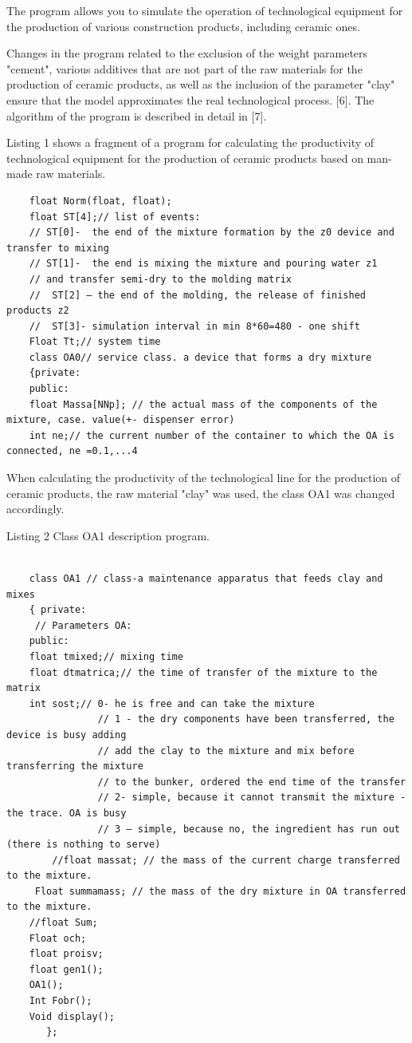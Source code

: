 \begin{multicols}{2}

The program allows you to simulate the operation of technological
equipment for the production of various construction products, including
ceramic ones.

Changes in the program related to the exclusion of the weight parameters
"cement", various additives that are not part of the raw materials for
the production of ceramic products, as well as the inclusion of the
parameter "clay" ensure that the model approximates the real
technological process. {[}6{]}. The algorithm of the program is
described in detail in {[}7{]}.

Listing 1 shows a fragment of a program for calculating the productivity
of technological equipment for the production of ceramic products based
on man-made raw materials.
\end{multicols}

\begin{lstlisting}
	float Norm(float, float);
	float ST[4];// list of events:
	// ST[0]-  the end of the mixture formation by the z0 device and transfer to mixing
	// ST[1]-  the end is mixing the mixture and pouring water z1
	// and transfer semi-dry to the molding matrix
	//  ST[2] – the end of the molding, the release of finished products z2
	//  ST[3]- simulation interval in min 8*60=480 - one shift
	Float Tt;// system time
	class OA0// service class. a device that forms a dry mixture
	{private:
	public:
	float Massa[NNp]; // the actual mass of the components of the mixture, case. value(+- dispenser error)
	int ne;// the current number of the container to which the OA is connected, ne =0.1,...4
\end{lstlisting}
\begin{multicols}{2}

When calculating the productivity of the technological line for the
production of ceramic products, the raw material "clay" was used, the
class OA1 was changed accordingly.
\end{multicols}

Listing 2 Class OA1 description program.

\begin{lstlisting}

	class OA1 // class-a maintenance apparatus that feeds clay and mixes
	{ private:
	 // Parameters OA:
	public:
	float tmixed;// mixing time
	float dtmatrica;// the time of transfer of the mixture to the matrix
	int sost;// 0- he is free and can take the mixture
				// 1 - the dry components have been transferred, the device is busy adding
				// add the clay to the mixture and mix before transferring the mixture
				// to the bunker, ordered the end time of the transfer
				// 2- simple, because it cannot transmit the mixture - the trace. OA is busy
				// 3 – simple, because no, the ingredient has run out (there is nothing to serve)
		//float massat; // the mass of the current charge transferred to the mixture.
	 Float summamass; // the mass of the dry mixture in OA transferred to the mixture.
	//float Sum;
	Float och;
	float proisv;
	float gen1();
	OA1();
	Int Fobr();
	Void display();
	   };
	
\end{lstlisting}

